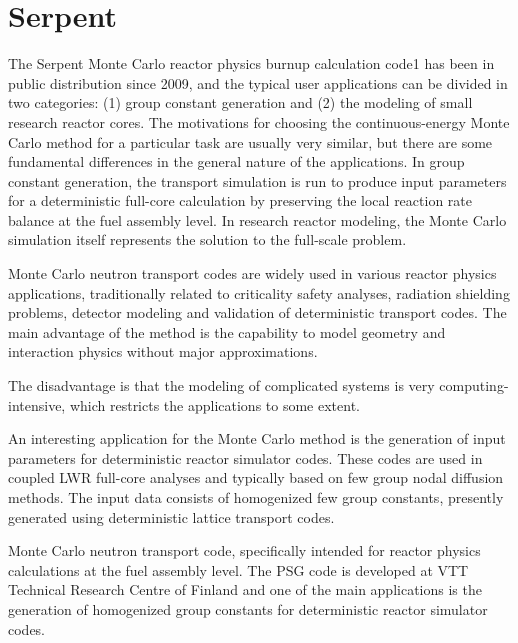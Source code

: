 \documentclass[11pt,letterpaper]{article}
\begin{document}

\section{Serpent}

The Serpent Monte Carlo reactor physics burnup calculation code1 has been in public distribution since 2009, and the typical user applications can be divided in two categories: (1) group constant generation and (2) the modeling of small research reactor cores. The motivations for choosing the continuous-energy Monte Carlo method for a particular task are usually very similar, but there are some fundamental differences in the general nature of the applications. In group constant generation, the transport simulation is run to produce input parameters for a deterministic full-core calculation by preserving the local reaction rate balance at the fuel assembly level. In research reactor modeling, the Monte Carlo simulation itself represents the solution to the full-scale problem.

\cite{leppanen_calculation_2014}

Monte Carlo neutron transport codes are widely used in various reactor physics
applications, traditionally related to criticality safety analyses, radiation
shielding problems, detector modeling and validation of deterministic transport
codes.
The main advantage of the method is the capability to model geometry and interaction physics without major approximations.

The disadvantage is that the modeling of complicated systems is very computing-intensive, which
restricts the applications to some extent.

An interesting application for the Monte Carlo method is the generation of input parameters for deterministic reactor simulator codes.
These codes are used in coupled LWR full-core analyses and typically based on few group nodal diffusion methods.
The input data consists of homogenized few group constants, presently generated using deterministic lattice transport codes.

Monte Carlo neutron transport code, specifically intended for reactor physics calculations at the fuel assembly level.
The PSG code is developed at VTT Technical Research Centre of Finland and one of the main applications is the generation of homogenized group constants for deterministic reactor simulator codes.

\cite{leppanen_development_2007}
\end{document}
